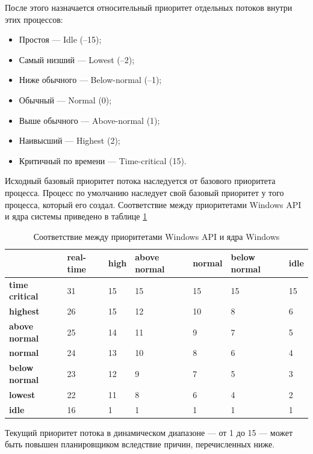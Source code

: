 После этого назначается относительный приоритет отдельных потоков внутри этих процессов:
\begin{itemize}[label=---]
	\item Простоя — Idle (–15);
	\item  Самый низший — Lowest (–2);
	\item Ниже обычного — Below-normal (–1);
	\item Обычный — Normal (0);
	\item Выше обычного — Above-normal (1);
	\item Наивысший — Highest (2);
	\item Критичный по времени — Time-critical (15).
\end{itemize}

Исходный базовый приоритет потока наследуется от базового приоритета процесса. Процесс по умолчанию наследует свой базовый приоритет у того процесса, который его создал. Соответствие между приоритетами Windows API и ядра системы приведено в таблице \ref{tbl:priority}


\begin{table}[h]
	\captionsetup{justification=raggedright,singlelinecheck=off,margin=2mm}
	\caption{Соответствие между приоритетами Windows API и ядра Windows}
	\begin{center}
		\begin{tabular}{|l|p{45pt}|p{45pt}|p{45pt}|p{45pt}|p{45pt}|p{45pt}|}
			\hline
			{} & \textbf{real-time} & \textbf{high} & \textbf{above normal} & \textbf{normal} & \textbf{below normal} & \textbf{idle}\\
			\hline
			\textbf{time critical} & 31 & 15 & 15 & 15 & 15 & 15 \\
			\hline
			\textbf{highest} & 26 & 15 & 12 & 10 & 8 & 6 \\
			\hline
			\textbf{above normal} & 25 & 14 & 11 & 9 & 7 & 5 \\
			\hline
			\textbf{normal} & 24 & 13 & 10 & 8 & 6 & 4 \\
			\hline
			\textbf{below normal} & 23 & 12 & 9 & 7 & 5 & 3 \\
			\hline
			\textbf{lowest} & 22 & 11 & 8 & 6 & 4 & 2 \\
			\hline
			\textbf{idle} & 16 & 1 & 1 & 1 & 1 & 1 \\
			\hline
		\end{tabular}
	\end{center}
	\label{tbl:priority}
\end{table}
\newpage

Текущий приоритет потока в динамическом диапазоне --- от 1 до 15 --- может быть повышен планировщиком вследствие причин, перечисленных ниже.

